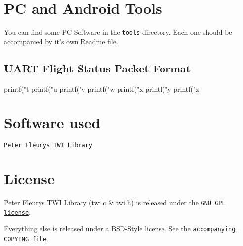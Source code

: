\section*{P\-C and Android Tools}

You can find some P\-C Software in the \href{https://github.com/xythobuz/xyControl/tree/master/tools}{\tt tools} directory. Each one should be accompanied by it's own Readme file.

\subsection*{U\-A\-R\-T-\/\-Flight Status Packet Format}

\begin{DoxyVerb}printf("t%
printf("u%
printf("v%
printf("w%
printf("x%
printf("y%
printf("z%
\end{DoxyVerb}


\section*{Software used}


\begin{DoxyItemize}
\item \href{http://homepage.hispeed.ch/peterfleury/avr-software.html}{\tt Peter Fleurys T\-W\-I Library}
\end{DoxyItemize}

\section*{License}

Peter Fleurys T\-W\-I Library (\hyperlink{twi_8c_source}{twi.\-c} \& \hyperlink{twi_8h}{twi.\-h}) is released under the \href{http://www.gnu.org/licenses/gpl.html}{\tt G\-N\-U G\-P\-L license}.

Everything else is released under a B\-S\-D-\/\-Style license. See the \href{https://github.com/xythobuz/xyControl/blob/master/COPYING}{\tt accompanying C\-O\-P\-Y\-I\-N\-G file}. 